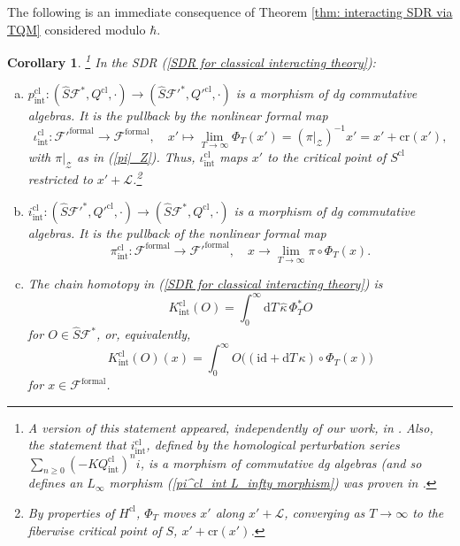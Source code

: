 \documentclass{amsart}
\theoremstyle{plain} %
\newtheorem{cor}[thm]{Corollary}
\theoremstyle{definition}
\theoremstyle{remark}
\newcommand{\mc}{\mathcal}
\newcommand{\mr}{\mathrm}
\newcommand{\ra}{\rightarrow}
\newcommand{\wh}{\widehat}
\newcommand{\F}{\mathcal{F}}
\newcommand{\LL}{\mathcal{L}}
\newcommand{\RR}{\mathbb{R}}
\newcommand{\ii}{\mathrm{int}}
\newcommand{\cl}{\mathrm{cl}}
\newcommand{\formal}{\mathrm{formal}}
\newcommand{\Cr}{\mathrm{cr}}
\newcommand{\dr}{\mathrm{d}}
\begin{document}

The following is an immediate consequence of Theorem \ref{thm: interacting SDR via TQM} considered modulo $\hbar$.
\begin{cor}\!\!\!\footnote{A version of this statement appeared, independently of our work, in \cite{Getzler_talk}. Also, the statement that $i_\ii^\cl$, defined by the homological perturbation series $\sum_{n\geq 0} (- K Q^\cl_\ii)^n i$, is a morphism of commutative dg algebras (and so defines an $L_\infty$ morphism (\ref{pi^cl_int L_infty morphism}) was proven in \cite{Berglund}.}
\label{cor: class limit of interacting ipK via flow of H^cl}
    In the SDR (\ref{SDR for classical interacting theory}):
    \begin{enumerate}[(a)]
        \item $p_\ii^\cl\colon (\wh{S}\F^*,Q^\cl,\cdot)\ra (\wh{S} \F'^*,Q'^\cl,\cdot)$ is a morphism of dg commutative algebras. It is the pullback by the nonlinear formal map
        \begin{equation}\label{iota_int^cl}
            \iota_\ii^\cl\colon \F'^\formal\ra \F^\formal,\quad x'\mapsto \lim_{T\ra \infty} %
            \Phi_T(x')=(\pi|_\mc{Z})^{-1}x'=x'+\Cr(x'),
        \end{equation}
        with $\pi|_\mc{Z}$ as in (\ref{pi|_Z}). Thus, $\iota_\ii^\mr{cl}$ maps $x'$ to the critical point of $S^\cl$ restricted to $x'+\LL$.\footnote{
        By properties of $H^\cl$, $\Phi_T$ moves $x'$ along $x'+\LL$, converging as $T\ra\infty$ to the fiberwise critical point of $S$, $x'+\Cr(x')$. %
        }
        \item \label{cor: class limit of interacting ipK via flow of H^cl (b)}
        $i_\ii^\cl \colon (\wh{S}\F'^*,Q'^\cl,\cdot)\ra (\wh{S} \F^*,Q^\cl,\cdot)$ is a morphism of dg commutative algebras. It is the pullback of the nonlinear formal map
        \begin{equation}\label{pi_int^cl}
            \pi_\ii^\cl\colon \F^\formal\ra \F'^\formal,\quad x\ra \lim_{T\ra\infty} \pi \circ %
            \Phi_T (x).
        \end{equation}
        \item The chain homotopy in (\ref{SDR for classical interacting theory}) is
        \begin{equation}
            K_\ii^\cl(O)=\int_0^\infty \dr T\, \wh\kappa\, \Phi_T^* O
        \end{equation}
        for $O\in \wh{S}\F^*$, or, equivalently,
        \begin{equation}
            K_\ii^\cl(O)(x)=\int_0^\infty O\Big((\mr{id}+\dr T\, \kappa)\circ\Phi_T(x)\Big)
        \end{equation}
        for $x\in \F^\formal$.
    \end{enumerate}
\end{cor}
\end{document}
